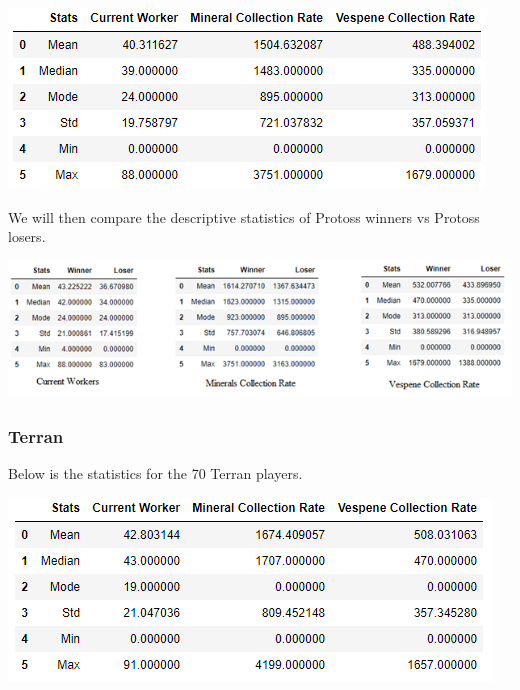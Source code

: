 \documentclass[a4paper,12pt]{report}
\begin{document}
\begin{center}
    \captionsetup{type=figure}
    \includegraphics[width=.9\linewidth]{media/ProtossDescriptive.png}
    \label{fig:ProtossDescriptive}
\end{center}

We will then compare the descriptive statistics of Protoss winners vs Protoss losers. 

\begin{center}
    \captionsetup{type=figure}
    \includegraphics[width=.9\linewidth]{media/ProtossWinnervsLoser.png}
\end{center}

\subsubsection{Terran}
Below is the statistics for the 70 Terran players.

\begin{center}
    \captionsetup{type=figure}
    \includegraphics[width=.9\linewidth]{media/TerranDescriptive.png}
\end{center}
\end{document}
